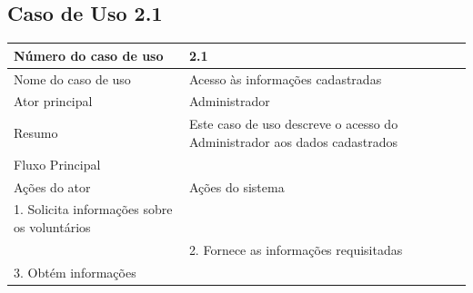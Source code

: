 

\newpage

  \subsection{Caso de Uso 2.1}
    \begin{table}[h]
    \begin{center}
    \begin{tabular}{|p{5cm}|p{10cm}|}
      \hline
      Número do caso de uso & 2.1\\ 
      \hline
      Nome do caso de uso   & Acesso às informações cadastradas\\
      \hline
      Ator principal        & Administrador\\
      \hline
      Resumo                & Este caso de uso descreve o acesso do Administrador aos dados cadastrados\\
      \hline
      Fluxo Principal       & \\
      \hline
      Ações do ator         & Ações do sistema \\
      \hline
      1. Solicita informações sobre os voluntários & \\
      \hline
      & 2. Fornece as informações requisitadas\\
      \hline
      3. Obtém informações & \\
      \hline

      
    \end{tabular}
    \end{center}
    \end{table}



